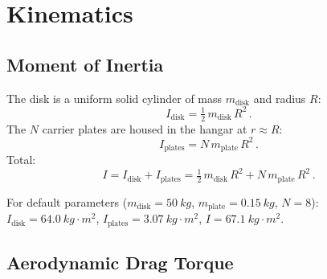 \documentclass[11pt,a4paper]{article}
\begin{document}
\section{Kinematics}
\label{sec:kinematics}

\subsection{Moment of Inertia}

The disk is a uniform solid cylinder of mass $m_\mathrm{disk}$ and
radius $R$:
\begin{equation}
  I_\mathrm{disk} = \tfrac{1}{2}\,m_\mathrm{disk}\,R^2\,.
  \label{eq:Idisk}
\end{equation}
The $N$ carrier plates are housed in the hangar at $r \approx R$:
\begin{equation}
  I_\mathrm{plates} = N\,m_\mathrm{plate}\,R^2\,.
  \label{eq:Iplates}
\end{equation}
Total:
\begin{equation}
  I = I_\mathrm{disk} + I_\mathrm{plates}
    = \tfrac{1}{2}\,m_\mathrm{disk}\,R^2 + N\,m_\mathrm{plate}\,R^2\,.
  \label{eq:Itotal}
\end{equation}

For default parameters ($m_\mathrm{disk} = \SI{50}{kg}$,
$m_\mathrm{plate} = \SI{0.15}{kg}$, $N = 8$):
$I_\mathrm{disk} = \SI{64.0}{kg\cdot m^2}$,
$I_\mathrm{plates} = \SI{3.07}{kg\cdot m^2}$,
$I = \SI{67.1}{kg\cdot m^2}$.

\subsection{Aerodynamic Drag Torque}
\end{document}
